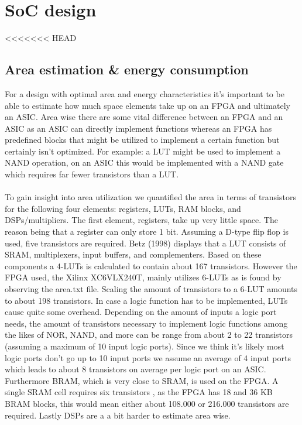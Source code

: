 \section{SoC design}
<<<<<<< HEAD
\subsection{Area estimation & energy consumption}
For a design with optimal area and energy characteristics it's important to be able to estimate how much space elements take up on an FPGA and ultimately an ASIC. Area wise there are some vital difference between an FPGA and an ASIC as an ASIC can directly implement functions whereas an FPGA has predefined blocks that might be utilized to implement a certain function but certainly isn't optimized. For example: a LUT might be used to implement a NAND operation, on an ASIC this would be implemented with a NAND gate which requires far fewer transistors than a LUT.\\\\
To gain insight into area utilization we quantified the area in terms of transistors for the following four elements: registers, LUTs, RAM blocks, and DSPs/multipliers. The first element, registers, take up very little space. The reason being that a register can only store 1 bit. Assuming a D-type flip flop is used, five transistors are required. %
Betz (1998) displays that a LUT consists of SRAM, multiplexers, input buffers, and complementers. Based on these components a 4-LUTs is calculated to contain about 167 transistors. However the FPGA used, the Xilinx XC6VLX240T, mainly utilizes 6-LUTs as is found by observing the area.txt file. Scaling the amount of transistors to a 6-LUT amounts to about 198 transistors. In case a logic function has to be implemented, LUTs cause quite some overhead. Depending on the amount of inputs a logic port needs, the amount of transistors necessary to implement logic functions among the likes of NOR, NAND, and more can be range from about 2 to 22 transistors (assuming a maximum of 10 input logic ports). Since we think it's likely most logic ports don't go up to 10 input ports we assume an average of 4 input ports which leads to about 8 transistors on average per logic port on an ASIC.\\
Furthermore BRAM, which is very close to SRAM, is used on the FPGA. A single SRAM cell requires six transistors  %
, as the FPGA has 18 and 36 KB BRAM blocks, this would mean either about 108.000 or 216.000 transistors are required. Lastly DSPs are a a bit harder to estimate area wise. %
